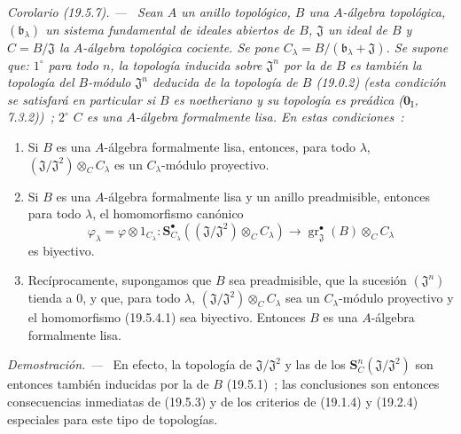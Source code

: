 \documentclass[10pt,oneside]{book}
\makeatletter
\newcommand{\gr}{\operatorname{gr}}
\newcommand{\setmanualcurrentlabel}[1]{\def\@currentlabel{#1}}
\newcommand{\oldpage}[2][]{%
  \setcounter{footnote}{0}%
  \marginpar{\scriptsize\textbf{#1}~|~#2}\ignorespaces}
\newenvironment{corollary}[1][]{%
  \setmanualcurrentlabel{#1}\par\medskip\noindent\itshape Corolario (#1). ---\ }{\par}
\newenvironment{proof}{%
  \par\medskip\noindent\textit{Demostración. ---\ }}{\par}
\makeatother
\begin{document}
\begin{corollary}[19.5.7]
\label{0.19.5.7-es}
Sean $A$ un anillo topológico, $B$ una $A$-álgebra topológica,
$(\mathfrak b_\lambda)$ un sistema fundamental de ideales abiertos de $B$,
$\mathfrak J$ un ideal de $B$ y $C=B/\mathfrak J$ la $A$-álgebra topológica
cociente. Se pone $C_\lambda=B/(\mathfrak b_\lambda+\mathfrak J)$. Se supone
que: $1^\circ$ para todo $n$, la topología inducida sobre $\mathfrak J^n$ por
la de $B$ es también la topología del $B$-módulo $\mathfrak J^n$ deducida de
la topología de $B$ \textup{(19.0.2) (esta condición se satisfará en particular si
$B$ es \emph{noetheriano} y su topología es \emph{preádica} ($\mathbf 0_{\mathrm I}$,
7.3.2))}~; $2^\circ$ $C$ es una $A$-álgebra formalmente lisa. En estas
condiciones~:
\begin{enumerate}
  \item[\rm(i)] Si $B$ es una $A$-álgebra formalmente lisa, entonces, para todo
  $\lambda$, $(\mathfrak J/\mathfrak J^2)\otimes_C C_\lambda$ es un
  $C_\lambda$-módulo proyectivo.
  \item[\rm(ii)] Si $B$ es una $A$-álgebra formalmente lisa y un anillo
  preadmisible, entonces para todo $\lambda$, el homomorfismo canónico
  \begin{equation}
  \label{0.19.5.7.1-es}
    \varphi_\lambda=\varphi\otimes 1_{C_\lambda}:
    \mathbf S_{C_\lambda}^\bullet((\mathfrak J/\mathfrak J^2)\otimes_C C_\lambda)
    \longrightarrow\gr_{\mathfrak J}^\bullet(B)\otimes_C C_\lambda
    \tag{19.5.7.1}
  \end{equation}
  es biyectivo.

  \oldpage[0\textsubscript{IV-1}]{100}

  \item[\rm(iii)] Recíprocamente, supongamos que $B$ sea preadmisible, que la
  sucesión $(\mathfrak J^n)$ tienda a $0$, y que, para todo $\lambda$,
  $(\mathfrak J/\mathfrak J^2)\otimes_C C_\lambda$ sea un $C_\lambda$-módulo
  proyectivo y el homomorfismo \textup{(19.5.4.1)} sea biyectivo. Entonces $B$ es una
  $A$-álgebra formalmente lisa.
\end{enumerate}
\end{corollary}

\begin{proof}
En efecto, la topología de $\mathfrak J/\mathfrak J^2$ y las de los
$\mathbf S_C^n(\mathfrak J/\mathfrak J^2)$ son entonces también inducidas por la
de $B$ (19.5.1)~; las conclusiones son entonces consecuencias inmediatas de
(19.5.3) y de los criterios de (19.1.4) y (19.2.4) especiales para este tipo de
topologías.
\end{proof}
\end{document}
